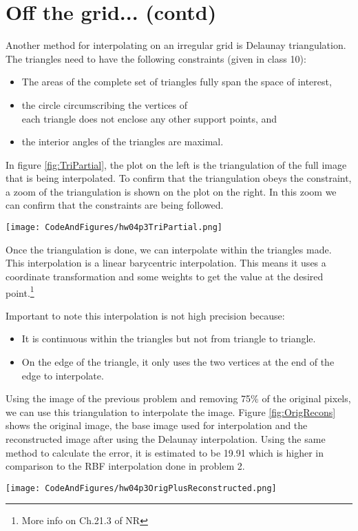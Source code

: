 \section{Off the grid... (contd)}

Another method for interpolating on an irregular grid is Delaunay triangulation. The triangles need to have the following constraints (given in class 10):
\begin{itemize}
    \item The areas of the complete set of triangles fully span the space of interest,
    \item the circle circumscribing the vertices of\\
    each triangle does not enclose any other support points, and
    \item the interior angles of the triangles are maximal.
\end{itemize}

In figure \ref{fig:TriPartial}, the plot on the left is the triangulation of the full image that is being interpolated. To confirm that the triangulation obeys the constraint, a zoom of the triangulation is shown on the plot on the right. In this zoom we can confirm that the constraints are being followed. 

\begin{figure*}
    \centering
    \texttt{[image: CodeAndFigures/hw04p3TriPartial.png]}
    \caption{Complete Delaunay triangulation and a zoom of the triangulation showing the middle section.}
    \label{fig:TriPartial}
\end{figure*}

Once the triangulation is done, we can interpolate within the triangles made. This interpolation is a linear barycentric interpolation. This means it uses a coordinate transformation and some weights to get the value at the desired point.\footnote{More info on Ch.21.3 of NR}

Important to note this interpolation is not high precision because:
\begin{itemize}
    \item It is continuous within the triangles but not from triangle to triangle.
    \item On the edge of the triangle, it only uses the two vertices at the end of the edge to interpolate.
\end{itemize}

Using the image of the previous problem and removing 75\% of the original pixels, we can use this triangulation to interpolate the image. Figure \ref{fig:OrigRecons} shows the original image, the base image used for interpolation and the reconstructed image after using the Delaunay interpolation. Using the same method to calculate the error, it is estimated to be 19.91 which is higher in comparison to the RBF interpolation done in problem 2.

\begin{figure*}
    \centering
    \texttt{[image: CodeAndFigures/hw04p3OrigPlusReconstructed.png]}
    \caption{In the left, is the original image. In the middle, is the image with 75\% of the pixels removed. In the right, the interpolated image.}
    \label{fig:OrigRecons}
\end{figure*}